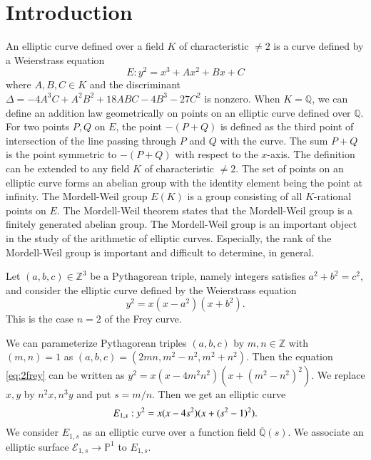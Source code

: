 \documentclass[a4paper]{jarticle} %
\theoremstyle{definition}
\theoremstyle{remark}
\begin{document}
\section{Introduction}
An elliptic curve defined over a field $K$ of characteristic $\neq 2$ is a curve defined by a Weierstrass equation
\begin{equation*}
    E: y^{2} = x^{3} + Ax^2 + Bx + C
\end{equation*}
where $A,B,C \in K$ and the discriminant $\Delta = -4A^3C + A^2B^2 + 18ABC - 4B^3 - 27C^2$ is nonzero.
When $K=\mathbb{Q}$, we can define an addition law geometrically on points on an elliptic curve defined over $\mathbb{Q}$.
For two points $P,Q$ on $E$, the point $-(P+Q)$ is defined as the third point of intersection of the line passing through $P$ and $Q$ with the curve.
The sum $P+Q$ is the point symmetric to $-(P+Q)$ with respect to the $x$-axis.
The definition can be extended to any field $K$ of characteristic $\neq 2$.
The set of points on an elliptic curve forms an abelian group with the identity element being the point at infinity.
The Mordell-Weil group $E(K)$ is a group consisting of all $K$-rational points on $E$.
The Mordell-Weil theorem states that the Mordell-Weil group is a finitely generated abelian group.
The Mordell-Weil group is an important object in the study of the arithmetic of elliptic curves.
Especially, the rank of the Mordell-Weil group is important and difficult to determine, in general.

Let $(a,b,c) \in \mathbb{Z}^3$ be a Pythagorean triple, namely integers satisfies $a^{2} + b^{2} = c^{2}$, and consider the elliptic curve defined by the Weierstrass equation
\begin{equation}
    \label{eq:2frey}
    y^{2} = x(x - a^{2})(x + b^{2}).
\end{equation}
This is the case $n=2$ of the Frey curve.

We can parameterize Pythagorean triples $(a,b,c)$ by $m,n \in \mathbb{Z}$ with $(m,n)=1$ as $(a,b,c) = (2mn, m^{2} - n^{2}, m^{2} + n^{2})$.
Then the equation \eqref{eq:2frey} can be written as $y^{2} = x(x - 4m^2n^2)(x + (m^{2} - n^2)^{2})$.
We replace $x,y$ by $n^2x, n^3y$ and put $s = m/n$.
Then we get an elliptic curve
\begin{equation*}
    \label{eq:E_{1,s}}
    E_{1,s}: y^{2} = x(x - 4s^{2})(x + (s^{2} - 1)^{2}).
\end{equation*}
We consider $E_{1,s}$ as an elliptic curve over a function field $\overline{\mathbb{Q}}(s)$.
We associate an elliptic surface $\mathcal{E}_{1,s} \to \mathbb{P}^1$ to $E_{1,s}$.
\end{document}
